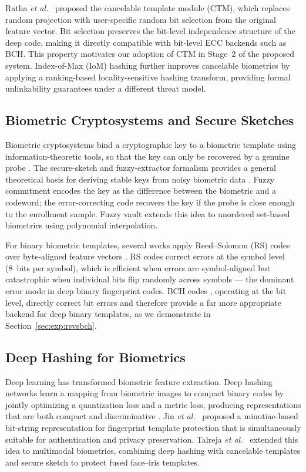 \documentclass[journal]{IEEEtran}
\newcommand{\etal}{\textit{et al.}}
\begin{document}
Ratha \etal\ \cite{ratha2007cancelable} proposed the cancelable
template module (CTM), which replaces random projection with
user-specific random bit selection from the original feature vector.
Bit selection preserves the bit-level independence structure of the
deep code, making it directly compatible with bit-level ECC backends
such as BCH.
This property motivates our adoption of CTM in Stage~2 of the
proposed system.
Index-of-Max (IoM) hashing \cite{jin2018iom} further improves
cancelable biometrics by applying a ranking-based locality-sensitive
hashing transform, providing formal unlinkability guarantees under a
different threat model.

\subsection{Biometric Cryptosystems and Secure Sketches}

Biometric cryptosystems bind a cryptographic key to a biometric
template using information-theoretic tools, so that the key can only
be recovered by a genuine probe \cite{rane2013secure}.
The secure-sketch and fuzzy-extractor formalism provides a general
theoretical basis for deriving stable keys from noisy biometric data
\cite{dodis2008fuzzy}.
Fuzzy commitment \cite{juels1999fuzzy} encodes the key as the
difference between the biometric and a codeword; the error-correcting
code recovers the key if the probe is close enough to the enrollment
sample.
Fuzzy vault \cite{juels2002fuzzy} extends this idea to unordered
set-based biometrics using polynomial interpolation.

For binary biometric templates, several works apply
Reed--Solomon (RS) codes over byte-aligned feature vectors
\cite{sutcu2007protecting,hao2006combining}.
RS codes correct errors at the symbol level (8~bits per symbol),
which is efficient when errors are symbol-aligned but catastrophic
when individual bits flip randomly across symbols — the dominant
error mode in deep binary fingerprint codes.
BCH codes \cite{bch1960}, operating at the bit level, directly
correct bit errors and therefore provide a far more appropriate
backend for deep binary templates, as we demonstrate in
Section~\ref{sec:exp:rsvsbch}.

\subsection{Deep Hashing for Biometrics}

Deep learning has transformed biometric feature extraction.
Deep hashing networks learn a mapping from biometric images to
compact binary codes by jointly optimizing a quantization loss
and a metric loss, producing representations that are both
compact and discriminative
\cite{liu2016deep,lai2015simultaneous,zhu2016deep}.
Jin \etal\ \cite{jin2017deep} proposed a minutiae-based bit-string
representation for fingerprint template protection that is
simultaneously suitable for authentication and privacy preservation.
Talreja \etal\ \cite{talreja2021deep} extended this idea to
multimodal biometrics, combining deep hashing with cancelable
templates and secure sketch to protect fused face--iris templates.
\end{document}
